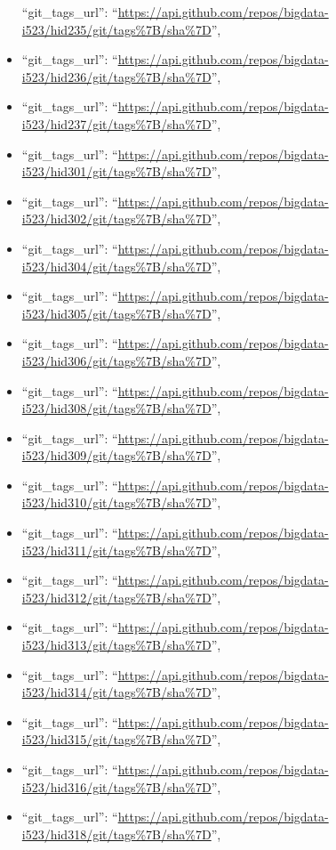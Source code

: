 \begin{itemize}
  ``git\_tags\_url'':
  ``\url{https://api.github.com/repos/bigdata-i523/hid235/git/tags\%7B/sha\%7D}'',
\item
  ``git\_tags\_url'':
  ``\url{https://api.github.com/repos/bigdata-i523/hid236/git/tags\%7B/sha\%7D}'',
\item
  ``git\_tags\_url'':
  ``\url{https://api.github.com/repos/bigdata-i523/hid237/git/tags\%7B/sha\%7D}'',
\item
  ``git\_tags\_url'':
  ``\url{https://api.github.com/repos/bigdata-i523/hid301/git/tags\%7B/sha\%7D}'',
\item
  ``git\_tags\_url'':
  ``\url{https://api.github.com/repos/bigdata-i523/hid302/git/tags\%7B/sha\%7D}'',
\item
  ``git\_tags\_url'':
  ``\url{https://api.github.com/repos/bigdata-i523/hid304/git/tags\%7B/sha\%7D}'',
\item
  ``git\_tags\_url'':
  ``\url{https://api.github.com/repos/bigdata-i523/hid305/git/tags\%7B/sha\%7D}'',
\item
  ``git\_tags\_url'':
  ``\url{https://api.github.com/repos/bigdata-i523/hid306/git/tags\%7B/sha\%7D}'',
\item
  ``git\_tags\_url'':
  ``\url{https://api.github.com/repos/bigdata-i523/hid308/git/tags\%7B/sha\%7D}'',
\item
  ``git\_tags\_url'':
  ``\url{https://api.github.com/repos/bigdata-i523/hid309/git/tags\%7B/sha\%7D}'',
\item
  ``git\_tags\_url'':
  ``\url{https://api.github.com/repos/bigdata-i523/hid310/git/tags\%7B/sha\%7D}'',
\item
  ``git\_tags\_url'':
  ``\url{https://api.github.com/repos/bigdata-i523/hid311/git/tags\%7B/sha\%7D}'',
\item
  ``git\_tags\_url'':
  ``\url{https://api.github.com/repos/bigdata-i523/hid312/git/tags\%7B/sha\%7D}'',
\item
  ``git\_tags\_url'':
  ``\url{https://api.github.com/repos/bigdata-i523/hid313/git/tags\%7B/sha\%7D}'',
\item
  ``git\_tags\_url'':
  ``\url{https://api.github.com/repos/bigdata-i523/hid314/git/tags\%7B/sha\%7D}'',
\item
  ``git\_tags\_url'':
  ``\url{https://api.github.com/repos/bigdata-i523/hid315/git/tags\%7B/sha\%7D}'',
\item
  ``git\_tags\_url'':
  ``\url{https://api.github.com/repos/bigdata-i523/hid316/git/tags\%7B/sha\%7D}'',
\item
  ``git\_tags\_url'':
  ``\url{https://api.github.com/repos/bigdata-i523/hid318/git/tags\%7B/sha\%7D}'',

\end{itemize}
